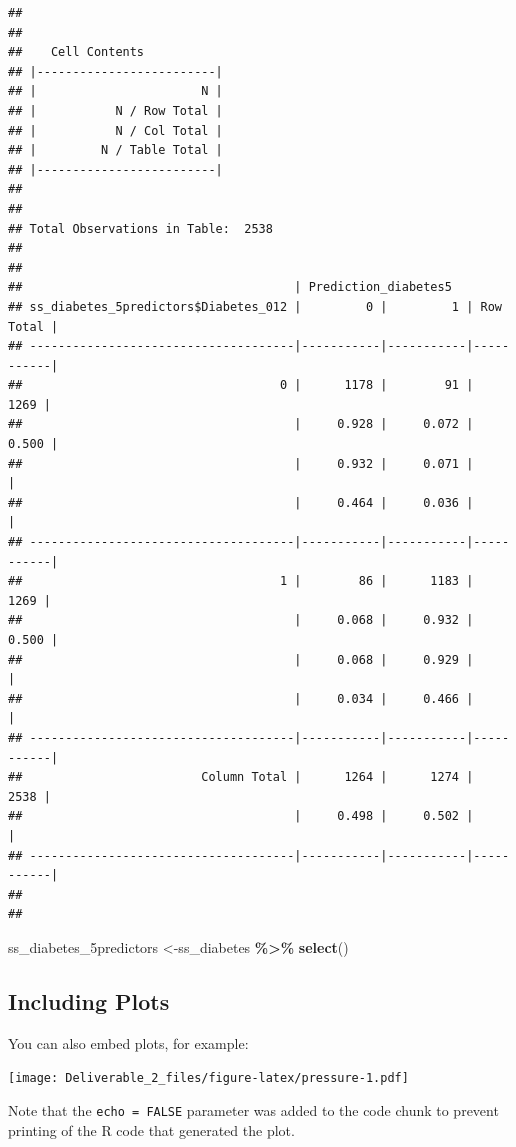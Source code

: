 \documentclass[
]{article}
\newenvironment{Shaded}{\begin{snugshade}}{\end{snugshade}}
\newcommand{\FunctionTok}[1]{\textcolor[rgb]{0.13,0.29,0.53}{\textbf{#1}}}
\newcommand{\NormalTok}[1]{#1}
\newcommand{\OtherTok}[1]{\textcolor[rgb]{0.56,0.35,0.01}{#1}}
\newcommand{\SpecialCharTok}[1]{\textcolor[rgb]{0.81,0.36,0.00}{\textbf{#1}}}
\begin{document}
\begin{verbatim}
## 
##  
##    Cell Contents
## |-------------------------|
## |                       N |
## |           N / Row Total |
## |           N / Col Total |
## |         N / Table Total |
## |-------------------------|
## 
##  
## Total Observations in Table:  2538 
## 
##  
##                                      | Prediction_diabetes5 
## ss_diabetes_5predictors$Diabetes_012 |         0 |         1 | Row Total | 
## -------------------------------------|-----------|-----------|-----------|
##                                    0 |      1178 |        91 |      1269 | 
##                                      |     0.928 |     0.072 |     0.500 | 
##                                      |     0.932 |     0.071 |           | 
##                                      |     0.464 |     0.036 |           | 
## -------------------------------------|-----------|-----------|-----------|
##                                    1 |        86 |      1183 |      1269 | 
##                                      |     0.068 |     0.932 |     0.500 | 
##                                      |     0.068 |     0.929 |           | 
##                                      |     0.034 |     0.466 |           | 
## -------------------------------------|-----------|-----------|-----------|
##                         Column Total |      1264 |      1274 |      2538 | 
##                                      |     0.498 |     0.502 |           | 
## -------------------------------------|-----------|-----------|-----------|
## 
## 
\end{verbatim}

\begin{Shaded}
\begin{Highlighting}[]
\NormalTok{ss\_diabetes\_5predictors }\OtherTok{\textless{}{-}}\NormalTok{ss\_diabetes }\SpecialCharTok{\%\textgreater{}\%}
  \FunctionTok{select}\NormalTok{()}
\end{Highlighting}
\end{Shaded}

\hypertarget{including-plots}{%
\subsection{Including Plots}\label{including-plots}}

You can also embed plots, for example:

\texttt{[image: Deliverable\_2\_files/figure-latex/pressure-1.pdf]}

Note that the \texttt{echo\ =\ FALSE} parameter was added to the code
chunk to prevent printing of the R code that generated the plot.
\end{document}
